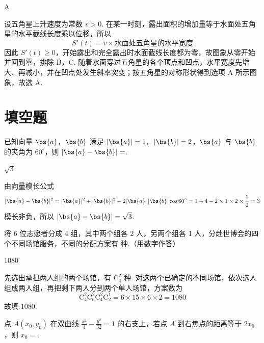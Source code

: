 \begin{answer}
A
\end{answer}

\begin{solution}
设五角星上升速度为常数 \(v>0\). 在某一时刻，露出面积的增加量等于水面处五角星的水平截线长度乘以位移，所以
\[
S'(t)=v\times\text{水面处五角星的水平宽度}
\]
因此 \(S'(t)\geqslant0\)，开始露出和完全露出时水面截线长度都为零，故图象从零开始并回到零，排除 B，C. 随着水面穿过五角星的各个顶点和凹点，水平宽度先增大、再减小，并在凹点处发生斜率突变；按五角星的对称形状得到选项 A 所示图象，故选 A.
\end{solution}

\section{填空题}

\begin{problem}
已知向量 \(\bs{a}\)，\(\bs{b}\) 满足 \(|\bs{a}| = 1\)，\(|\bs{b}| = 2\)，\(\bs{a}\) 与 \(\bs{b}\) 的夹角为 \(60^\circ\)，则 \(|\bs{a}-\bs{b}| =\)\fillinblank{}.
\end{problem}

\begin{answer}
\(\sqrt{3}\)
\end{answer}

\begin{solution}
由向量模长公式
\[
|\bs{a}-\bs{b}|^2=|\bs{a}|^2+|\bs{b}|^2-2|\bs{a}|\,|\bs{b}|\cos60^\circ
=1+4-2\times1\times2\times\frac12=3
\]
模长非负，所以 \(|\bs{a}-\bs{b}|=\sqrt3\).
\end{solution}

\begin{problem}
将 6 位志愿者分成 4 组，其中两个组各 2 人，另两个组各 1 人，分赴世博会的四个不同场馆服务，不同的分配方案有\fillinblank{} 种.（用数字作答）
\end{problem}

\begin{answer}
1080
\end{answer}

\begin{solution}
先选出承担两人组的两个场馆，有 \(\mathrm C_4^2\) 种. 对这两个已确定的不同场馆，依次选人组成两人组，再把剩下两人分到两个单人场馆，方案数为
\[
\mathrm C_4^2\mathrm C_6^2\mathrm C_4^2\mathrm C_2^1
=6\times15\times6\times2=1080
\]
故填 \(1080\).
\end{solution}

\begin{problem}
点 \(A(x_0, y_0)\) 在双曲线 \(\frac{x^2}{4} - \frac{y^2}{32} = 1\) 的右支上，若点 \(A\) 到右焦点的距离等于 \(2x_0\)，则 \(x_0 =\)\fillinblank{}.
\end{problem}

